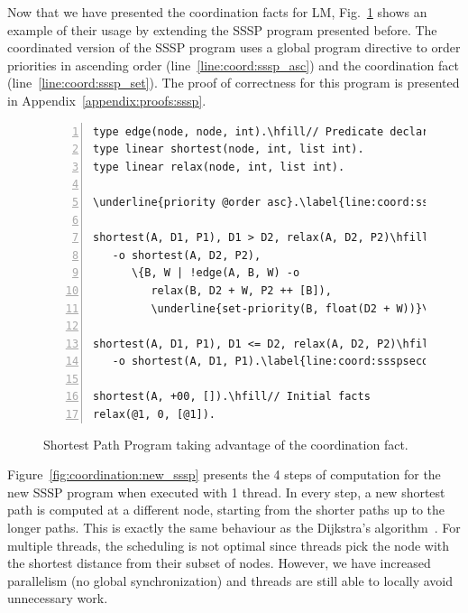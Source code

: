 Now that we have presented the coordination facts for LM,
Fig.~\ref{code:shortest_path_program_coord} shows an example of their usage by
extending the SSSP program presented before. The coordinated version of the SSSP
program uses a global program directive to order priorities in ascending order
(line~\ref{line:coord:sssp_asc}) and the coordination fact 
(line~\ref{line:coord:sssp_set}). The proof of correctness for this program is
presented in Appendix~\ref{appendix:proofs:sssp}.

\begin{figure}[ht]
\begin{Verbatim}[numbers=left,commandchars=\\\{\},fontsize=\codesize]
type edge(node, node, int).\hfill// Predicate declaration
type linear shortest(node, int, list int).
type linear relax(node, int, list int).

\underline{priority @order asc}.\label{line:coord:sssp_asc}

shortest(A, D1, P1), D1 > D2, relax(A, D2, P2)\hfill// Rule 1: newly improved path\label{line:coord:ssspfirst1}
   -o shortest(A, D2, P2),
      \{B, W | !edge(A, B, W) -o
         relax(B, D2 + W, P2 ++ [B]),
         \underline{set-priority(B, float(D2 + W))}\}.\label{line:coord:sssp_set}\label{line:coord:ssspfirst2}

shortest(A, D1, P1), D1 <= D2, relax(A, D2, P2)\hfill// Rule 2: longer path\label{line:coord:ssspsecond1}
   -o shortest(A, D1, P1).\label{line:coord:ssspsecond2}

shortest(A, +00, []).\hfill// Initial facts
relax(@1, 0, [@1]).
\end{Verbatim}
   \caption{Shortest Path Program taking advantage of the 
   coordination fact.}
   \label{code:shortest_path_program_coord}
\end{figure}

Figure~\ref{fig:coordination:new_sssp} presents the 4 steps of computation for
the new SSSP program when executed with 1 thread. In every step, a new shortest
path is computed at a different node, starting from the shorter paths up to the
longer paths. This is exactly the same behaviour as the Dijkstra's
algorithm~\cite{Dijkstra}.  For multiple threads, the scheduling is not
optimal since threads pick the node with the shortest distance from their subset
of nodes. However, we have increased parallelism (no global synchronization)
and threads are still able to locally avoid unnecessary work.

